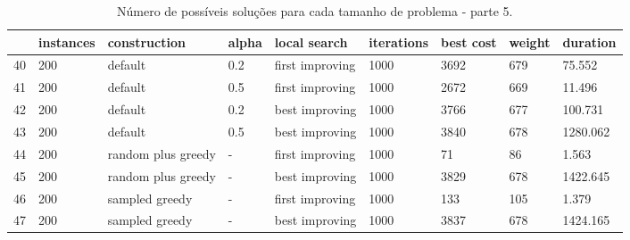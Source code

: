 \begin{landscape}
    \begin{table}
    \centering
    \begin{tabular}{lllllllll}
    \toprule
    {} & instances &        construction & alpha &     local search & iterations & best cost & weight &  duration \\
    \midrule
    40 &       200 &             default &   0.2 &  first improving &       1000 &      3692 &    679 &    75.552 \\
    41 &       200 &             default &   0.5 &  first improving &       1000 &      2672 &    669 &    11.496 \\
    42 &       200 &             default &   0.2 &   best improving &       1000 &      3766 &    677 &   100.731 \\
    43 &       200 &             default &   0.5 &   best improving &       1000 &      3840 &    678 &  1280.062 \\
    44 &       200 &  random plus greedy &     - &  first improving &       1000 &        71 &     86 &     1.563 \\
    45 &       200 &  random plus greedy &     - &   best improving &       1000 &      3829 &    678 &  1422.645 \\
    46 &       200 &      sampled greedy &     - &  first improving &       1000 &       133 &    105 &     1.379 \\
    47 &       200 &      sampled greedy &     - &   best improving &       1000 &      3837 &    678 &  1424.165 \\
    \bottomrule
    \end{tabular}
    \caption{Número de possíveis soluções para cada tamanho de problema - parte 5.}
    \label{table:all-data-5}
    \end{table}


\end{landscape}
